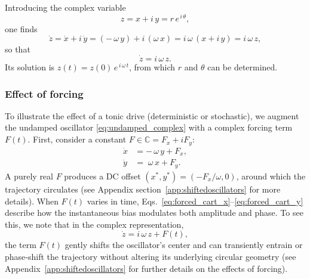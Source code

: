 \documentclass[11pt]{article}
\numberwithin{equation}{section}
\begin{document}
Introducing the complex variable
\begin{equation}
    z = x + i\,y = r\,e^{\,i\,\theta},
    \label{eq:undamped_complex_z}
\end{equation}
one finds
\begin{equation}
    \dot{z} = \dot{x} + i\,\dot{y}
            = (-\,\omega\,y) + i\,(\omega\,x)
            = i\,\omega\,(x + i\,y)
            = i\,\omega\,z,    
\end{equation}
so that
\begin{equation}
    \dot{z} = i\,\omega\,z.
    \label{eq:undamped_complex}
\end{equation}
Its solution is $z(t) = z(0)\,e^{\,i\,\omega\,t}$, from which $r$ and $\theta$ can be determined.


\subsubsection{Effect of forcing}

To illustrate the effect of a tonic drive (deterministic or stochastic), we augment the undamped oscillator \eqref{eq:undamped_complex}
with a complex forcing term \(F(t)\). First, consider a constant \(F\in\mathbb{C}=F_x+iF_y\):
\begin{align}
\dot x &= -\,\omega\,y + F_x,
\label{eq:forced_cart_x}\\
\dot y &= \;\omega\,x + F_y.
\label{eq:forced_cart_y}
\end{align}
A purely real \(F\) produces a DC offset \((x^*,y^*) = (-F_x/\omega,0)\), around which the trajectory circulates (see Appendix section~\ref{app:shiftedoscillators} for more details). When \(F(t)\) varies in time, Eqs.~\eqref{eq:forced_cart_x}–\eqref{eq:forced_cart_y} describe how the instantaneous bias modulates both amplitude and phase.
To see this, we note that in the complex representation,
\begin{equation}
\dot z = i\,\omega\,z + F(t),
\label{eq:forced_time_complex}
\end{equation}
the term \(F(t)\) gently shifts the oscillator’s center and can transiently entrain or phase‐shift the trajectory without altering its underlying circular geometry (see Appendix~\ref{app:shiftedoscillators} for further details on the effects of forcing).
\end{document}
